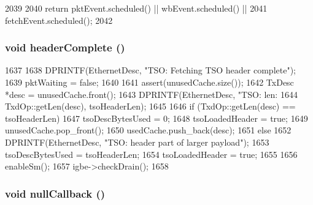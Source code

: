 \begin{DoxyCode}
2039 {
2040     return pktEvent.scheduled() || wbEvent.scheduled() ||
2041         fetchEvent.scheduled();
2042 }
\end{DoxyCode}
\hypertarget{classIGbE_1_1TxDescCache_ae7e4853724fee8019b3bdd04200b9d6b}{
\subsubsection[{headerComplete}]{\setlength{\rightskip}{0pt plus 5cm}void headerComplete ()}}
\label{classIGbE_1_1TxDescCache_ae7e4853724fee8019b3bdd04200b9d6b}



\begin{DoxyCode}
1637 {
1638     DPRINTF(EthernetDesc, "TSO: Fetching TSO header complete\n");
1639     pktWaiting = false;
1640 
1641     assert(unusedCache.size());
1642     TxDesc *desc = unusedCache.front();
1643     DPRINTF(EthernetDesc, "TSO: len: %
1644             TxdOp::getLen(desc), tsoHeaderLen);
1645 
1646     if (TxdOp::getLen(desc) == tsoHeaderLen) {
1647         tsoDescBytesUsed = 0;
1648         tsoLoadedHeader = true;
1649         unusedCache.pop_front();
1650         usedCache.push_back(desc);
1651     } else {
1652         DPRINTF(EthernetDesc, "TSO: header part of larger payload\n");
1653         tsoDescBytesUsed = tsoHeaderLen;
1654         tsoLoadedHeader = true;
1655     }
1656     enableSm();
1657     igbe->checkDrain();
1658 }
\end{DoxyCode}
\hypertarget{classIGbE_1_1TxDescCache_a34032325b571ff60682217adbf73ad37}{
\subsubsection[{nullCallback}]{\setlength{\rightskip}{0pt plus 5cm}void nullCallback ()}}
\label{classIGbE_1_1TxDescCache_a34032325b571ff60682217adbf73ad37}



